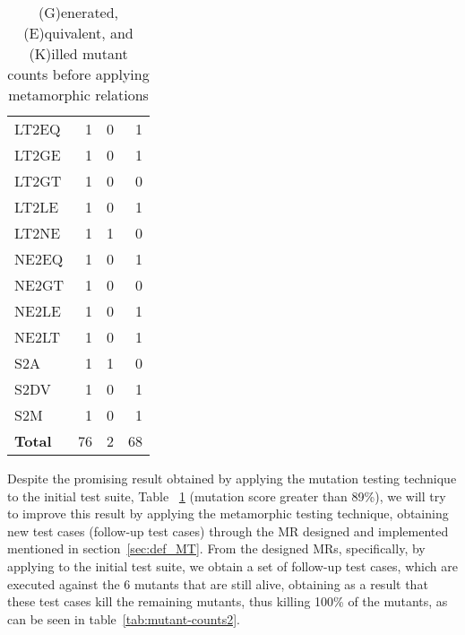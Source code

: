 \begin{table}
\begin{tabular}{lrrr}
LT2EQ   &       1       &       0       &       1       \\
LT2GE   &       1       &       0       &       1       \\
LT2GT   &       1       &       0       &       0       \\
LT2LE   &       1       &       0       &       1       \\
LT2NE   &       1       &       1       &       0       \\
NE2EQ   &       1       &       0       &       1       \\
NE2GT   &       1       &       0       &       0       \\
NE2LE   &       1       &       0       &       1       \\
NE2LT   &       1       &       0       &       1       \\
S2A         &   1       &       1       &       0       \\
S2DV    &       1       &       0       &       1       \\
S2M         &   1       &       0       &       1       \\

    \midrule
    \textbf{Total} & 76 & 2 & 68 \\
    \bottomrule
    \end{tabular}
    \caption{(G)enerated, (E)quivalent, and (K)illed mutant counts before applying metamorphic relations}
    \label{tab:mutant-counts}
\end{table}


Despite the promising result obtained by applying the mutation testing technique to the initial test suite, Table ~\ref{tab:mutant-counts} (mutation score greater than 89\%), we will try to improve this result by applying the metamorphic testing technique, obtaining new test cases (follow-up test cases) through the MR designed and implemented mentioned in section~\ref{sec:def_MT}. From the designed MRs, specifically, by applying  to the initial test suite, we obtain a set of follow-up test cases, which are executed against the 6 mutants that are still alive, obtaining as a result that these test cases kill the remaining mutants, thus killing 100\% of the mutants, as can be seen in table~\ref{tab:mutant-counts2}.

